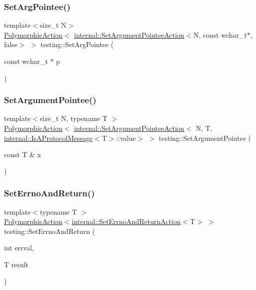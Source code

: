 \subsubsection{\texorpdfstring{SetArgPointee()}{SetArgPointee()}\hspace{0.1cm}{\footnotesize\ttfamily [3/3]}}
{\footnotesize\ttfamily template$<$size\+\_\+t N$>$ \\
\mbox{\hyperlink{classtesting_1_1PolymorphicAction}{Polymorphic\+Action}}$<$ \mbox{\hyperlink{classtesting_1_1internal_1_1SetArgumentPointeeAction}{internal\+::\+Set\+Argument\+Pointee\+Action}}$<$N, const wchar\+\_\+t$\ast$, false$>$ $>$ testing\+::\+Set\+Arg\+Pointee (\begin{DoxyParamCaption}\item[{const wchar\+\_\+t $\ast$}]{p }\end{DoxyParamCaption})}

\mbox{\label{namespacetesting_a03b315d27c91a8e719f2b6c09964130b}} 
\subsubsection{\texorpdfstring{SetArgumentPointee()}{SetArgumentPointee()}}
{\footnotesize\ttfamily template$<$size\+\_\+t N, typename T $>$ \\
\mbox{\hyperlink{classtesting_1_1PolymorphicAction}{Polymorphic\+Action}}$<$ \mbox{\hyperlink{classtesting_1_1internal_1_1SetArgumentPointeeAction}{internal\+::\+Set\+Argument\+Pointee\+Action}}$<$ N, T, \mbox{\hyperlink{structtesting_1_1internal_1_1IsAProtocolMessage}{internal\+::\+Is\+A\+Protocol\+Message}}$<$T$>$\+::value$>$ $>$ testing\+::\+Set\+Argument\+Pointee (\begin{DoxyParamCaption}\item[{const T \&}]{x }\end{DoxyParamCaption})}

\mbox{\label{namespacetesting_a31095e421f167fade2e6d4d60df1f4da}} 
\subsubsection{\texorpdfstring{SetErrnoAndReturn()}{SetErrnoAndReturn()}}
{\footnotesize\ttfamily template$<$typename T $>$ \\
\mbox{\hyperlink{classtesting_1_1PolymorphicAction}{Polymorphic\+Action}}$<$\mbox{\hyperlink{classtesting_1_1internal_1_1SetErrnoAndReturnAction}{internal\+::\+Set\+Errno\+And\+Return\+Action}}$<$T$>$ $>$ testing\+::\+Set\+Errno\+And\+Return (\begin{DoxyParamCaption}\item[{int}]{errval,  }\item[{T}]{result }\end{DoxyParamCaption})}

